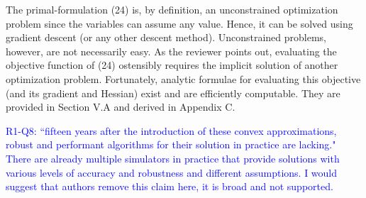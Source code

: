 The primal-formulation (24) is, by definition, an unconstrained optimization
problem since the variables can assume any value. Hence, it can be solved using
gradient descent (or any other descent method). Unconstrained problems, however,
are not necessarily easy. As the reviewer points out, evaluating the objective
function of (24) ostensibly requires the implicit solution of another
optimization problem. Fortunately, analytic formulae for evaluating this
objective (and its gradient and Hessian) exist and are efficiently computable.
They are provided  in Section V.A and derived in Appendix C.
\vspace{5mm}

\textcolor{blue}{R1-Q8: ``fifteen years after the introduction of these convex
approximations, robust and performant algorithms for their solution in practice
are lacking." There are already multiple simulators in practice that provide
solutions with various levels of accuracy and robustness and different
assumptions. I would suggest that authors remove this claim here, it is broad
and not supported.}

